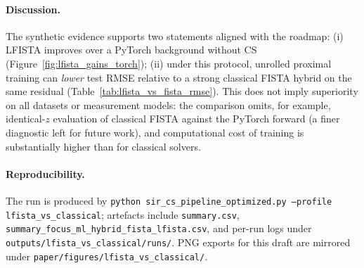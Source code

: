 \paragraph{Discussion.}
The synthetic evidence supports two statements aligned with the roadmap: (i) LFISTA improves over a PyTorch background without CS (Figure~\ref{fig:lfista_gains_torch}); (ii) under this protocol, unrolled proximal training can \emph{lower} test RMSE relative to a strong classical FISTA hybrid on the same residual (Table~\ref{tab:lfista_vs_fista_rmse}).
This does not imply superiority on all datasets or measurement models: the comparison omits, for example, identical-$z$ evaluation of classical FISTA against the PyTorch forward (a finer diagnostic left for future work), and computational cost of training is substantially higher than for classical solvers.

\paragraph{Reproducibility.}
The run is produced by \texttt{python sir\_cs\_pipeline\_optimized.py --profile lfista\_vs\_classical}; artefacts include \texttt{summary.csv}, \texttt{summary\_focus\_ml\_hybrid\_fista\_lfista.csv}, and per-run logs under \texttt{outputs/lfista\_vs\_classical/runs/}.
PNG exports for this draft are mirrored under \texttt{paper/figures/lfista\_vs\_classical/}.